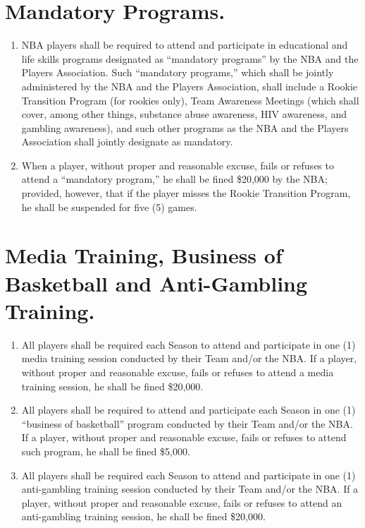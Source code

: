 \documentclass[
]{book}
\providecommand{\tightlist}{%
  \setlength{\itemsep}{0pt}\setlength{\parskip}{0pt}}
\begin{document}
\hypertarget{mandatory-programs.}{%
\section{Mandatory Programs.}\label{mandatory-programs.}}

\begin{enumerate}
\def\labelenumi{(\alph{enumi})}
\tightlist
\item
  NBA players shall be required to attend and participate in educational and life skills programs designated as ``mandatory programs'' by the NBA and the Players Association. Such ``mandatory programs,'' which shall be jointly administered by the NBA and the Players Association, shall include a Rookie Transition Program (for rookies only), Team Awareness Meetings (which shall cover, among other things, substance abuse awareness, HIV awareness, and gambling awareness), and such other programs as the NBA and the Players Association shall jointly designate as mandatory.
\item
  When a player, without proper and reasonable excuse, fails or refuses to attend a ``mandatory program,'' he shall be fined \$20,000 by the NBA; provided, however, that if the player misses the Rookie Transition Program, he shall be suspended for five (5) games.
\end{enumerate}

\hypertarget{media-training-business-of-basketball-and-anti-gambling-training.}{%
\section{Media Training, Business of Basketball and Anti-Gambling Training.}\label{media-training-business-of-basketball-and-anti-gambling-training.}}

\begin{enumerate}
\def\labelenumi{(\alph{enumi})}
\tightlist
\item
  All players shall be required each Season to attend and participate in one (1) media training session conducted by their Team and/or the NBA. If a player, without proper and reasonable excuse, fails or refuses to attend a media training session, he shall be fined \$20,000.
\item
  All players shall be required to attend and participate each Season in one (1) ``business of basketball'' program conducted by their Team and/or the NBA. If a player, without proper and reasonable excuse, fails or refuses to attend such program, he shall be fined \$5,000.
\item
  All players shall be required each Season to attend and participate in one (1) anti-gambling training session conducted by their Team and/or the NBA. If a player, without proper and reasonable excuse, fails or refuses to attend an anti-gambling training session, he shall be fined \$20,000.
\end{enumerate}
\end{document}
